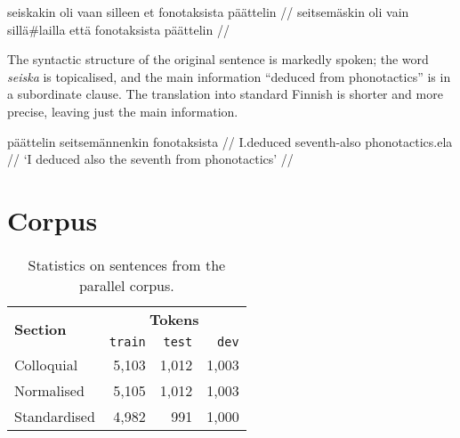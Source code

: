 \documentclass[11pt]{article}
\begin{document}
\ex
\begingl
\gla seiskakin oli vaan silleen et fonotaksista p\"{a}\"{a}ttelin //
\glb seitsem\"{a}skin oli vain sill\"{a}\#lailla ett\"{a} fonotaksista p\"{a}\"{a}ttelin //
\endgl
\xe

 The syntactic structure of the original sentence is markedly spoken; the word \emph{seiska} is topicalised, and the main information ``deduced from phonotactics'' is in a subordinate clause. 
The translation into standard Finnish is shorter and more precise, leaving just the main information.

\ex
\begingl
\gla p\"{a}\"{a}ttelin seitsem\"{a}nnenkin fonotaksista //
\glb I.deduced seventh-{\sc also} phonotactics.{\sc ela} //
\glft `I deduced also the seventh from phonotactics' //
\endgl
\xe






\section{Corpus}

\begin{table}
  \centering
 \begin{tabular}{|l|r|r|r|}
    \hline
    \multirow{2}{*}{\textbf{Section}} & \multicolumn{3}{|c|}{\textbf{Tokens}} \\\cline{2-4}
                                      & \texttt{train} & \texttt{test} & \texttt{dev} \\
    \hline
    Colloquial                           & 5,103 & 1,012 & 1,003 \\ 
    Normalised                           & 5,105 & 1,012 & 1,003 \\ 
    Standardised                         & 4,982 & 991 & 1,000 \\
    \hline
 \end{tabular} 
  \caption{Statistics on sentences from the parallel corpus.}
  \label{table:corpsize}
\end{table}
\end{document}
